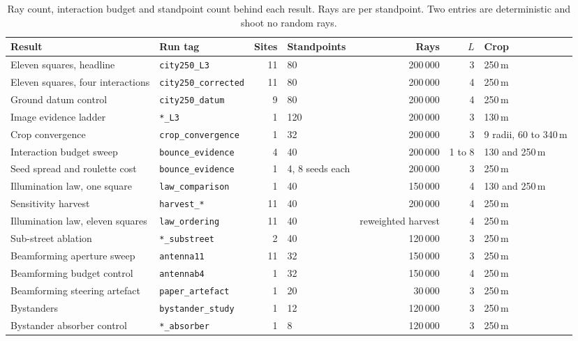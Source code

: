 \documentclass[journal]{IEEEtran}
\begin{document}
\begin{table}[t]
  \centering
  \caption{Ray count, interaction budget and standpoint count behind each
  result. Rays are per standpoint. Two entries are deterministic and shoot no
  random rays.}
  \label{tab:si-rays}
  \footnotesize
  \begin{tabular}{llrlrrl}
    \toprule
    Result & Run tag & Sites & Standpoints & Rays & $L$ & Crop \\
    \midrule
    Eleven squares, headline & \texttt{city250\_L3} & 11 & 80 & 200\,000 & 3 & 250\,m \\
    Eleven squares, four interactions & \texttt{city250\_corrected} & 11 & 80 & 200\,000 & 4 & 250\,m \\
    Ground datum control & \texttt{city250\_datum} & 9 & 80 & 200\,000 & 4 & 250\,m \\
    Image evidence ladder & \texttt{*\_L3} & 1 & 120 & 200\,000 & 3 & 130\,m \\
    Crop convergence & \texttt{crop\_convergence} & 1 & 32 & 200\,000 & 3 & 9 radii, 60 to 340\,m \\
    Interaction budget sweep & \texttt{bounce\_evidence} & 4 & 40 & 200\,000 & 1 to 8 & 130 and 250\,m \\
    Seed spread and roulette cost & \texttt{bounce\_evidence} & 1 & 4, 8 seeds each & 200\,000 & 3 & 250\,m \\
    Illumination law, one square & \texttt{law\_comparison} & 1 & 40 & 150\,000 & 4 & 130 and 250\,m \\
    Sensitivity harvest & \texttt{harvest\_*} & 11 & 40 & 200\,000 & 4 & 250\,m \\
    Illumination law, eleven squares & \texttt{law\_ordering} & 11 & 40 & reweighted harvest & 4 & 250\,m \\
    Sub-street ablation & \texttt{*\_substreet} & 2 & 40 & 120\,000 & 3 & 250\,m \\
    Beamforming aperture sweep & \texttt{antenna11} & 11 & 32 & 150\,000 & 3 & 250\,m \\
    Beamforming budget control & \texttt{antennab4} & 1 & 32 & 150\,000 & 4 & 250\,m \\
    Beamforming steering artefact & \texttt{paper\_artefact} & 1 & 20 & 30\,000 & 3 & 250\,m \\
    Bystanders & \texttt{bystander\_study} & 1 & 12 & 120\,000 & 3 & 250\,m \\
    Bystander absorber control & \texttt{*\_absorber} & 1 & 8 & 120\,000 & 3 & 250\,m \\

\end{tabular}
\end{table}
\end{document}
